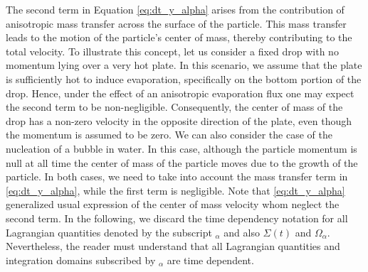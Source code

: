 The second term in Equation \ref{eq:dt_y_alpha} arises from the contribution of anisotropic mass transfer across the surface of the particle. 
This mass transfer leads to the motion of the particle's center of mass, thereby contributing to the total velocity.
To illustrate this concept, let us consider a fixed drop with no momentum lying over a very hot plate.
In this scenario, we assume that the plate is sufficiently hot to induce evaporation, specifically on the bottom portion of the drop.
Hence, under the effect of an anisotropic evaporation flux one may expect the second term to be non-negligible.
Consequently, the center of mass of the drop has a non-zero velocity in the opposite direction of the plate, even though the momentum is assumed to be zero.
We can also consider the case of the nucleation of a bubble in water. 
In this case, although the particle momentum is null at all time the center of mass of the particle moves due to the growth of the particle. 
In both cases, we need to take into account the mass transfer term in \ref{eq:dt_y_alpha}, while the first term is negligible. 
Note that \ref{eq:dt_y_alpha} generalized usual expression of the center of mass velocity whom neglect the second term.
In the following, we discard the time dependency notation for all Lagrangian quantities denoted by the subscript $_\alpha$ and also $\Sigma(t)$ and $\Omega_\alpha$.
Nevertheless, the reader must understand that all Lagrangian quantities and integration domains subscribed by $_\alpha$ are time dependent. 

